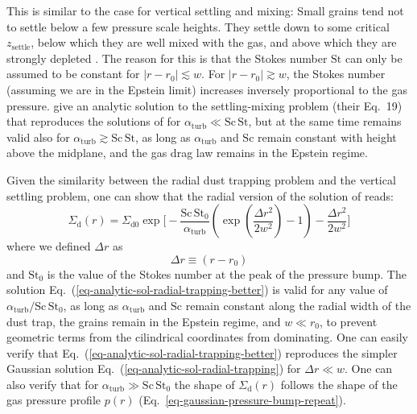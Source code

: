\documentclass{aa}
\begin{document}
This is similar to the case for
vertical settling and mixing: Small grains tend not to settle below a few
pressure scale heights. They settle down to some critical $z_{\mathrm{settle}}$,
below which they are well mixed with the gas, and above which they are strongly
depleted \citep{2004A&A...421.1075D}. The reason for this is that the Stokes
number $\mathrm{St}$ can only be assumed to be constant for $|r-r_0|\lesssim w$.
For $|r-r_0|\gtrsim w$, the Stokes number (assuming we are in the Epstein limit)
increases inversely proportional to the gas
pressure. \citet{2009A&A...496..597F} give an analytic solution to the
settling-mixing problem (their Eq.~19) that reproduces the solutions of
\citet{1995Icar..114..237D} for $\alpha_{\mathrm{turb}}\ll
\mathrm{Sc}\,\mathrm{St}$, but at the same time remains valid also for
$\alpha_{\mathrm{turb}}\gtrsim \mathrm{Sc}\,\mathrm{St}$, as long as
$\alpha_{\mathrm{turb}}$ and $\mathrm{Sc}$ remain constant with height above the
midplane, and the gas drag law remains in the Epstein regime.

Given the similarity between the radial dust trapping problem and the vertical
settling problem, one can show that the radial version of the solution of
\citet{2009A&A...496..597F} reads:
\begin{equation}\label{eq-analytic-sol-radial-trapping-better}
  \Sigma_{\mathrm{d}}(r) = \Sigma_{\mathrm{d0}} \exp\Bigg[
    -\frac{\mathrm{Sc}\,\mathrm{St}_0}{\alpha_{\mathrm{turb}}}
     \left(\exp\left(\frac{\Delta r^2}{2w^2}\right)-1\right)
    -\frac{\Delta r^2}{2w^2}\Bigg]
\end{equation}
where we defined $\Delta r$ as
\begin{equation}
\Delta r \equiv (r-r_0)
\end{equation}
and $\mathrm{St}_0$ is the value of the Stokes number at the peak of the
pressure bump.  The solution Eq.~(\ref{eq-analytic-sol-radial-trapping-better})
is valid for any value of $\alpha_{\mathrm{turb}}/\mathrm{Sc}\,\mathrm{St}_0$,
as long as $\alpha_{\mathrm{turb}}$ and $\mathrm{Sc}$ remain constant along the
radial width of the dust trap, the grains remain in the Epstein regime, and
$w\ll r_0$, to prevent geometric terms from the cilindrical coordinates
from dominating.  One can easily verify that
Eq.~(\ref{eq-analytic-sol-radial-trapping-better}) reproduces the simpler
Gaussian solution Eq.~(\ref{eq-analytic-sol-radial-trapping}) for $\Delta r\ll
w$. One can also verify that for $\alpha_{\mathrm{turb}}\gg
\mathrm{Sc}\,\mathrm{St}_0$ the shape of $\Sigma_{\mathrm{d}}(r)$ follows the
shape of the gas pressure profile $p(r)$
(Eq.~\ref{eq-gaussian-pressure-bump-repeat}).
\end{document}
